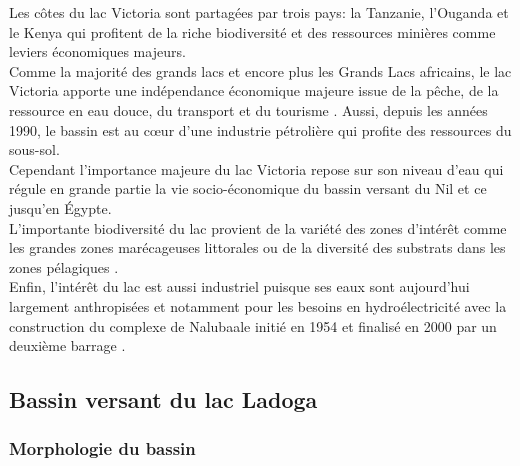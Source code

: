 Les côtes du lac Victoria sont partagées par trois pays: la Tanzanie, l'Ouganda et le Kenya qui profitent de la riche biodiversité et des ressources minières comme leviers économiques majeurs.\\
Comme la majorité des grands lacs et encore plus les Grands Lacs africains, le lac Victoria apporte une indépendance économique majeure issue de la pêche, de la ressource en eau douce, du transport et du tourisme \citep{crul1995}. Aussi, depuis les années 1990, le bassin est au cœur d'une industrie pétrolière qui profite des ressources du sous-sol.\\
Cependant l'importance majeure du lac Victoria repose sur son niveau d'eau qui régule en grande partie la vie socio-économique du bassin versant du Nil et ce jusqu'en \'Egypte.\\
L'importante biodiversité du lac provient de la variété des zones d'intérêt comme les grandes zones marécageuses littorales ou de la diversité des substrats dans les zones pélagiques \citep{paugy2019}.\\
Enfin, l'intérêt du lac est aussi industriel puisque ses eaux sont aujourd'hui largement anthropisées et notamment pour les besoins en hydroélectricité avec la construction du complexe de Nalubaale initié en 1954 et finalisé en 2000 par un deuxième barrage \citep{kull2006}. 
\subsection{{\selectfont Bassin versant du lac Ladoga}}
\label{sec:ladoga}
\subsubsection*{{\selectfont Morphologie du bassin}}

